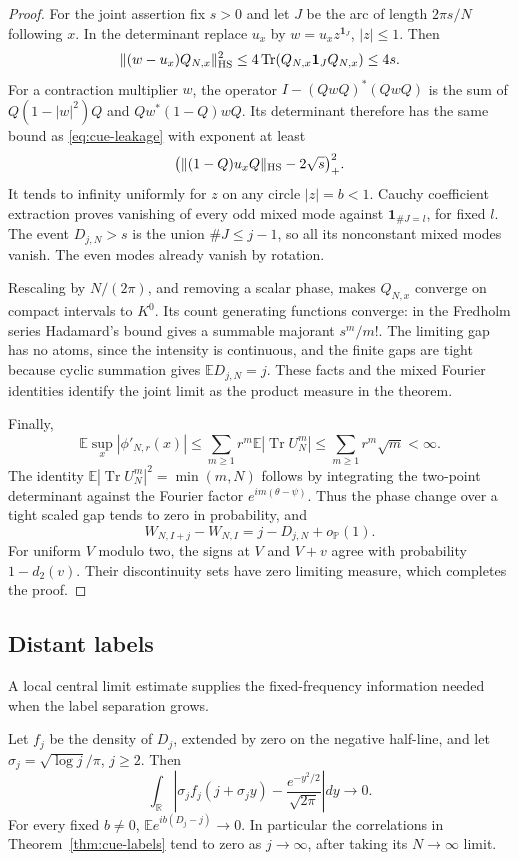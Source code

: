 \begin{proof}
For the joint assertion fix $s>0$ and let $J$ be the arc of length
$2\pi s/N$ following $x$. In the determinant replace $u_x$ by
$w=u_x z^{\mathbf1_J}$, $|z|\le1$. Then
\[
 \|(w-u_x)Q_{N,x}\|_{\rm HS}^2
 \le4\operatorname{Tr}(Q_{N,x}\mathbf1_JQ_{N,x})\le4s.
\]
For a contraction multiplier $w$, the operator
$I-(QwQ)^*(QwQ)$ is the sum of $Q(1-|w|^2)Q$ and
$Qw^*(1-Q)wQ$. Its determinant therefore has the same bound as
\eqref{eq:cue-leakage} with exponent at least
\[
 \bigl(\|(1-Q)u_xQ\|_{\rm HS}-2\sqrt s\bigr)_+^2.
\]
It tends to infinity uniformly for $z$ on any circle $|z|=b<1$.
Cauchy coefficient extraction proves vanishing of every odd mixed
mode against $\mathbf1_{\#J=l}$, for fixed $l$. The event
$D_{j,N}>s$ is the union $\#J\le j-1$, so all its nonconstant
mixed modes vanish. The even modes already vanish by rotation.

Rescaling by $N/(2\pi)$, and removing a scalar phase, makes
$Q_{N,x}$ converge on compact intervals to $K^0$. Its count
generating functions converge: in the Fredholm series Hadamard's
bound gives a summable majorant $s^m/m!$. The limiting gap has no
atoms, since the intensity is continuous, and the finite gaps are
tight because cyclic summation gives $\mathbb ED_{j,N}=j$.
These facts and the mixed Fourier identities identify the joint
limit as the product measure in the theorem.

Finally,
\[
 \mathbb E\sup_x|\phi'_{N,r}(x)|
 \le\sum_{m\ge1}r^m\mathbb E|\operatorname{Tr}U_N^m|
 \le\sum_{m\ge1}r^m\sqrt m<\infty.
\]
The identity $\mathbb E|\operatorname{Tr}U_N^m|^2=\min(m,N)$ follows
by integrating the two-point determinant against the Fourier factor
$e^{im(\theta-\psi)}$.
Thus the phase change over a tight scaled gap tends to zero in
probability, and
\[
 W_{N,I+j}-W_{N,I}=j-D_{j,N}+o_{\mathbb P}(1).
\]
For uniform $V$ modulo two, the signs at $V$ and $V+v$ agree with
probability $1-d_2(v)$. Their discontinuity sets have zero limiting
measure, which completes the proof.
\end{proof}

\subsection{Distant labels}
A local central limit estimate supplies the fixed-frequency information
needed when the label separation grows.

\begin{theorem}\label{thm:palm-local-limit}
Let $f_j$ be the density of $D_j$, extended by zero on the negative
half-line, and let $\sigma_j=\sqrt{\log j}/\pi$, $j\ge2$. Then
\[
 \int_{\mathbb R}\left|\sigma_j f_j(j+\sigma_j y)
       -\frac{e^{-y^2/2}}{\sqrt{2\pi}}\right|dy\longrightarrow0.
\]
For every fixed $b\ne0$, $\mathbb Ee^{ib(D_j-j)}\to0$.
In particular the correlations in Theorem~\ref{thm:cue-labels}
tend to zero as $j\to\infty$, after taking its $N\to\infty$ limit.
\end{theorem}

